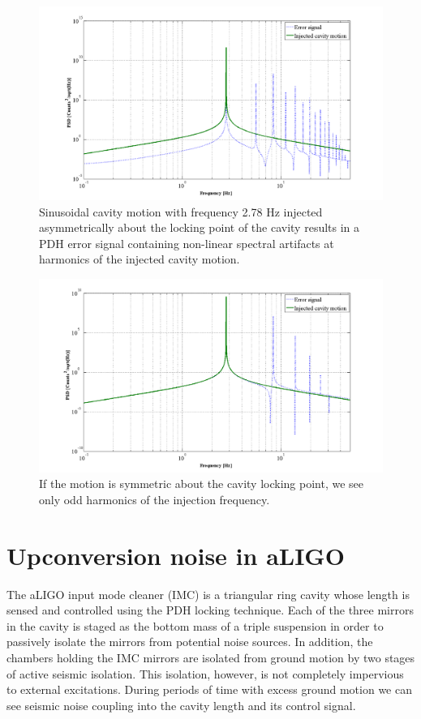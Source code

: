 \begin{figure}[h!]
\caption[PDH response to asymmetric cavity motion]{Sinusoidal cavity motion with frequency 2.78 Hz injected asymmetrically about the locking point of the cavity results in a PDH error signal containing non-linear spectral artifacts at harmonics of the injected cavity motion.}
\includegraphics[height=0.6\textwidth]{figures/IMCUpconversion/PDH_error_signal_harmonics.png}
\end{figure}

\begin{figure}[h!]
\caption[PDH response to symmetric cavity motion]{If the motion is symmetric about the cavity locking point, we see only odd harmonics of the injection frequency.}
\includegraphics[height=0.6\textwidth]{figures/IMCUpconversion/symmetric_PDH.png}
\end{figure}

\section{Upconversion noise in aLIGO}
The aLIGO input mode cleaner (IMC) is a triangular ring cavity whose length is sensed and controlled using the PDH locking technique. Each of the three mirrors in the cavity is staged as the bottom mass of a triple suspension in order to passively isolate the mirrors from  potential noise sources. In addition, the chambers holding the IMC mirrors are isolated from ground motion by two stages of active seismic isolation. This isolation, however, is not completely impervious to external excitations. During periods of time with excess ground motion we can see seismic noise coupling into the cavity length and its control signal.

